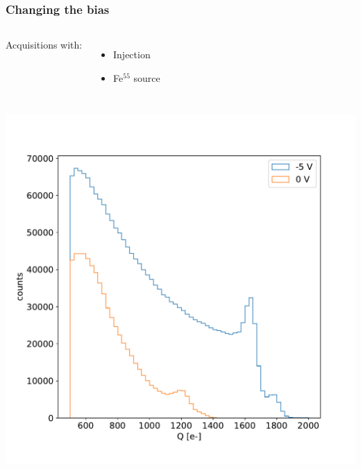     \begin{frame}
        \frametitle{Changing the bias}
        \begin{columns}
                Acquisitions with:
                \begin{itemize}
                    \item Injection
                    \item Fe$^{55}$ source
                \end{itemize}
                \begin{table}
                    \begin{center}
                    \end{center}
                \end{table}
        \end{columns}
        \begin{columns}
            \includegraphics[width=1.2\linewidth]{figures/charaterization/Fe_spectrum_bias.pdf}

\end{columns}
\end{frame}
